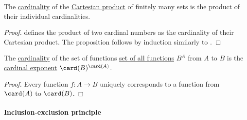 \begin{theorem}\label{thm:cardinality_product_rule}
  The \hyperref[def:cardinality]{cardinality} of the \hyperref[def:cartesian_product]{Cartesian product} of finitely many sets is the product of their individual cardinalities.
\end{theorem}
\begin{proof}
   defines the product of two cardinal numbers as the cardinality of their Cartesian product. The proposition follows by induction similarly to .
\end{proof}

\begin{theorem}\label{thm:cardinality_exponentiation_rule}
  The \hyperref[def:cardinality]{cardinality} of the set of functions \hyperref[def:set_of_all_functions]{set of all functions} \( B^A \) from \( A \) to \( B \) is the \hyperref[def:cardinal_exponentiation]{cardinal exponent} \( \card(B)^{\card(A)} \).
\end{theorem}
\begin{proof}
  Every function \( f: A \to B \) uniquely corresponds to a function from \( \card(A) \) to \( \card(B) \).
\end{proof}

\paragraph{Inclusion-exclusion principle}


